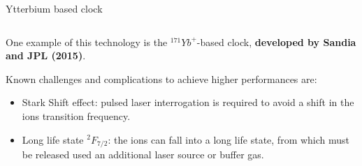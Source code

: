 \begin{frame}{Ytterbium based clock}
\begin{columns}[c, onlytextwidth]
\begin{column}{0.65\textwidth}
            One example of this technology is the $^{171}Yb^+$-based clock, \textbf{developed by Sandia and JPL (2015)}.

            \vspace{10pt}

            Known challenges and complications to achieve higher performances are:

            \begin{itemize}
                \item Stark Shift effect\footnotemark[1]: pulsed laser interrogation is required to avoid a shift in the ions transition frequency.
                \item Long life state $^2F_{7/2}$: the ions can fall into a long life state, from which must be released used an additional laser source or buffer gas.
            \end{itemize}

        \end{column}

    \end{columns}


\end{frame}




